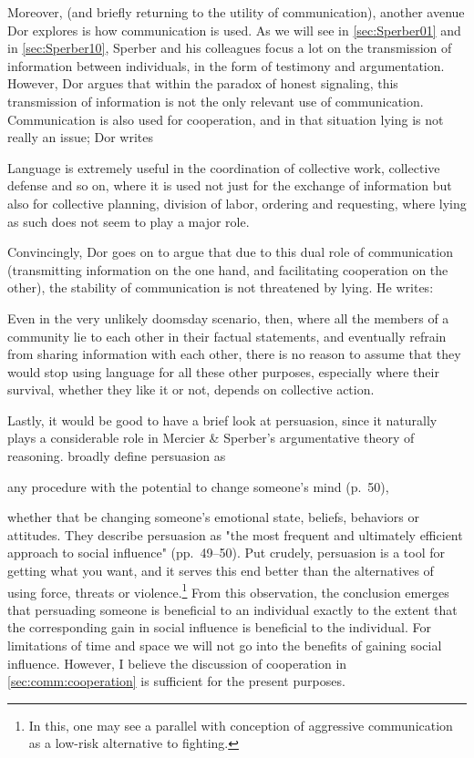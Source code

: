 Moreover, (and briefly returning to the utility of communication), another avenue Dor explores is how communication is used. As we will see in \cref{sec:Sperber01} and in \cref{sec:Sperber10}, Sperber and his colleagues focus a lot on the transmission of information between individuals, in the form of testimony and argumentation. However, Dor argues that within the paradox of honest signaling, this transmission of information is not the only relevant use of communication. Communication is also used for cooperation, and in that situation lying is not really an issue; Dor writes
\begin{quoting}
    Language is extremely useful in the coordination of collective work, collective defense and so on, where it is used not just for the exchange of information but also for collective planning, division of labor, ordering and requesting, where lying as such does not seem to play a major role.
    \hfill \citep[p.~51]{Dor17}
\end{quoting}
Convincingly, Dor goes on to argue that due to this dual role of communication (transmitting information on the one hand, and facilitating cooperation on the other), the stability of communication is not threatened by lying. He writes:
\begin{quoting}
    Even in the very unlikely doomsday scenario, then, where all the members of a community lie to each other in their factual statements, and eventually refrain from sharing information with each other, there is no reason to assume that they would stop using language for all these other purposes, especially where their survival, whether they like it or not, depends on collective action.
    \hfill \citep[p.~52]{Dor17}
\end{quoting}

Lastly, it would be good to have a brief look at persuasion, since it naturally plays a considerable role in Mercier \& Sperber's argumentative theory of reasoning.
\citet{Brinol09} broadly define persuasion as
\begin{quoting}
    any procedure with the potential to change someone's mind
    \hfill (p.~50),
\end{quoting}
whether that be changing someone's emotional state, beliefs, behaviors or attitudes.
They describe persuasion as "the most frequent and ultimately efficient approach to social influence" (pp.~49--50). Put crudely, persuasion is a tool for getting what you want, and it serves this end better than the alternatives of using force, threats or violence.\footnote{In this, one may see a parallel with  conception of aggressive communication as a low-risk alternative to fighting.}
From this observation, the conclusion emerges that persuading someone is beneficial to an individual exactly to the extent that the corresponding gain in social influence is beneficial to the individual.
For limitations of time and space we will not go into the benefits of gaining social influence. However, I believe the discussion of cooperation in \cref{sec:comm:cooperation} is sufficient for the present purposes.
